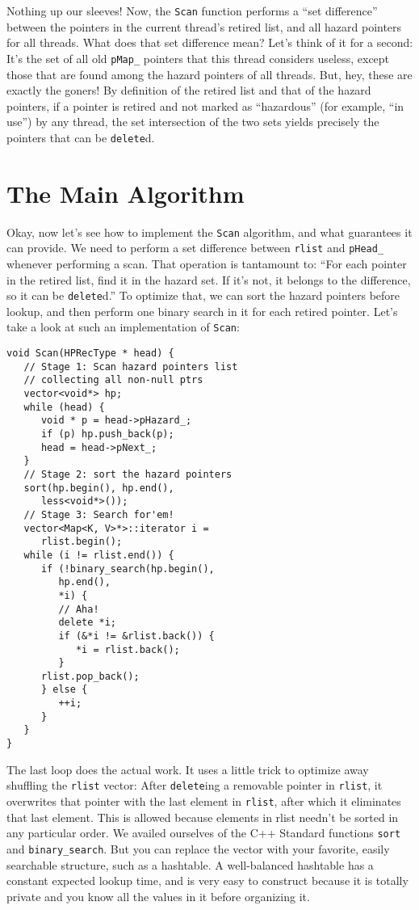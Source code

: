 \documentclass[a4paper,12pt,notitlepage,twoside,openright]{article}
\begin{document}
Nothing up our sleeves! Now, the \texttt{Scan} function performs a ``set difference'' between the pointers in the current thread's retired list, and all hazard pointers for all threads. What does that set difference mean? Let's think of it for a second: It's the set of all old \texttt{pMap\_} pointers that this thread considers useless, except those that are found among the hazard pointers of all threads. But, hey, these are exactly the goners! By definition of the retired list and that of the hazard pointers, if a pointer is retired and not marked as ``hazardous'' (for example, ``in use'') by any thread, the set intersection of the two sets yields precisely the pointers that can be \texttt{delete}d.

\section{The Main Algorithm}

Okay, now let's see how to implement the \texttt{Scan} algorithm, and what guarantees it can provide. We need to perform a set difference between \texttt{rlist} and \texttt{pHead\_} whenever performing a scan. That operation is tantamount to: ``For each pointer in the retired list, find it in the hazard set. If it's not, it belongs to the difference, so it can be \texttt{delete}d.'' To optimize that, we can sort the hazard pointers before lookup, and then perform one binary search in it for each retired pointer. Let's take a look at such an implementation of \texttt{Scan}:

\begin{verbatim}
void Scan(HPRecType * head) {
   // Stage 1: Scan hazard pointers list
   // collecting all non-null ptrs
   vector<void*> hp;
   while (head) {
      void * p = head->pHazard_;
      if (p) hp.push_back(p);
      head = head->pNext_;
   }
   // Stage 2: sort the hazard pointers
   sort(hp.begin(), hp.end(),
      less<void*>());
   // Stage 3: Search for'em!
   vector<Map<K, V>*>::iterator i =
      rlist.begin();
   while (i != rlist.end()) {
      if (!binary_search(hp.begin(),
         hp.end(),
         *i) {
         // Aha!
         delete *i;
         if (&*i != &rlist.back()) {
            *i = rlist.back();
         }
      rlist.pop_back();
      } else {
         ++i;
      }
   }
}
\end{verbatim}

The last loop does the actual work. It uses a little trick to optimize away shuffling the \texttt{rlist} vector: After \texttt{delete}ing a removable pointer in \texttt{rlist}, it overwrites that pointer with the last element in \texttt{rlist}, after which it eliminates that last element. This is allowed because elements in rlist needn't be sorted in any particular order. We availed ourselves of the C++ Standard functions \texttt{sort} and \texttt{binary\_search}. But you can replace the vector with your favorite, easily searchable structure, such as a hashtable. A well-balanced hashtable has a constant expected lookup time, and is very easy to construct because it is totally private and you know all the values in it before organizing it.
\end{document}
